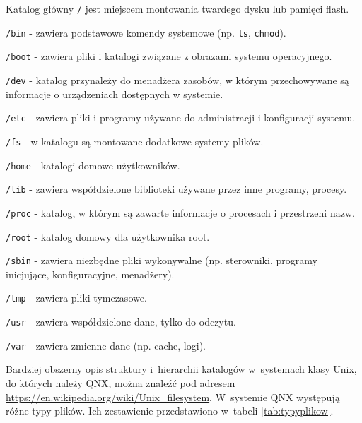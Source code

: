 \begin{myitemize}
\item Katalog główny \lstinline[style=MyBashStyle]{/} jest miejscem montowania twardego dysku lub pamięci flash.  
\item \lstinline[style=MyBashStyle]{/bin} - zawiera podstawowe komendy systemowe (np. \lstinline[style=MyBashStyle]{ls}, \lstinline[style=MyBashStyle]{chmod}). 
\item \lstinline[style=MyBashStyle]{/boot} - zawiera pliki i katalogi związane z obrazami systemu operacyjnego.
\item \lstinline[style=MyBashStyle]{/dev} - katalog przynależy do menadżera zasobów, w którym przechowywane są informacje o urządzeniach dostępnych w systemie. 
\item \lstinline[style=MyBashStyle]{/etc} - zawiera pliki i programy używane do administracji i konfiguracji systemu.
\item \lstinline[style=MyBashStyle]{/fs} - w katalogu są montowane dodatkowe systemy plików.
\item \lstinline[style=MyBashStyle]{/home} - katalogi domowe użytkowników.
\item \lstinline[style=MyBashStyle]{/lib} - zawiera współdzielone biblioteki używane przez inne programy, procesy. 
\item \lstinline[style=MyBashStyle]{/proc} - katalog, w którym są zawarte informacje o procesach i przestrzeni nazw. 
\item \lstinline[style=MyBashStyle]{/root} - katalog domowy dla użytkownika root.
\item \lstinline[style=MyBashStyle]{/sbin} - zawiera niezbędne pliki wykonywalne (np. sterowniki, programy inicjujące, konfiguracyjne, menadżery).
\item \lstinline[style=MyBashStyle]{/tmp} - zawiera pliki tymczasowe.
\item \lstinline[style=MyBashStyle]{/usr} - zawiera współdzielone dane, tylko do odczytu.
\item \lstinline[style=MyBashStyle]{/var} - zawiera zmienne dane (np. cache, logi). 
\end{myitemize}

Bardziej obszerny opis struktury i~hierarchii katalogów w~systemach klasy Unix, do których należy QNX, można znaleźć pod adresem \href{https://en.wikipedia.org/wiki/Unix\_filesystem}{https://en.wikipedia.org/wiki/Unix\_filesystem}. W~systemie QNX występują różne typy plików. Ich zestawienie przedstawiono w~tabeli \ref{tab:typyplikow}. 


